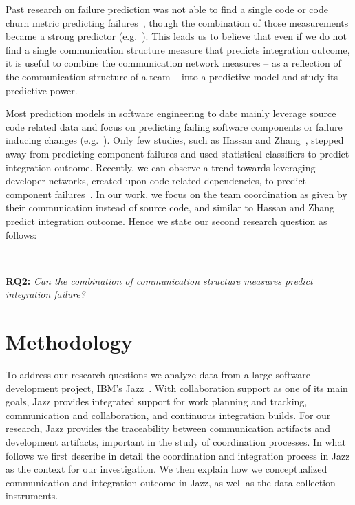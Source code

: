 \documentclass[12pt,oneside]{book}
\begin{document}
Past research on failure prediction was not able to find a single code or code
churn metric predicting
failures~\cite{nagappan:icse:2006,basili:1996tse,denaro:2002seke}, though the
combination of those measurements became a strong predictor
(e.g.~\cite{mockus:2000bell}). This leads us to believe that even if we do not
find a single communication structure measure that predicts integration outcome,
it is useful to combine the communication network measures -- as a reflection of
the communication structure of a team -- into a predictive model and study its
predictive power.

Most prediction models in software engineering to date mainly leverage source
code related data and focus on predicting failing software components or failure
inducing changes
(e.g.~\cite{bell:2005tse,schroeter:isese:2006,zimmermann:icse:2008,kim:2008tse}).
Only few studies, such as Hassan and Zhang~\cite{hassan:ase:2006}, stepped away
from predicting component failures and used statistical classifiers to predict
integration outcome. Recently, we can observe a trend towards leveraging
developer networks, created upon code related dependencies, to predict component
failures~\cite{pinzger:fse:2008,fse08:meneely}. In our work, we focus on the
team coordination as given by their communication instead of source code, and
similar to Hassan and Zhang predict integration outcome. Hence we state our
second research question as follows:

\ \

\noindent\textbf{RQ2:} \emph{Can the combination of communication structure
measures predict integration failure?}








\section{Methodology}
\label{sec:Methodology}

To address our research questions we analyze data from a large software
development project, IBM's Jazz~\cite{frost:ieeesoftware:2007}. With collaboration support
as one of its main goals, Jazz provides integrated support for work planning and
tracking, communication and collaboration, and continuous integration builds. For
our research, Jazz provides the traceability between communication artifacts and
development artifacts, important in the study of coordination processes. In what
follows we first describe in detail the coordination and integration process in
Jazz as the context for our investigation. We then explain how we conceptualized
communication and integration outcome in Jazz, as well as the data collection
instruments.
\end{document}
